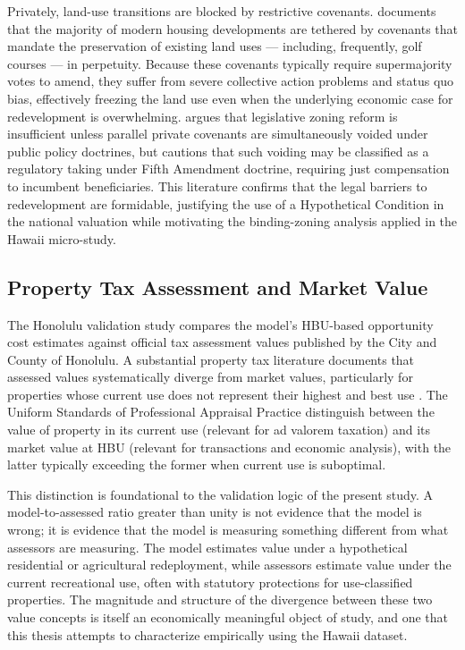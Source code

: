 \documentclass[11pt, letterpaper]{article}
\begin{document}
Privately, land-use transitions are blocked by restrictive covenants. \textcite{Ellickson2022} documents that the majority of modern housing developments are tethered by covenants that mandate the preservation of existing land uses --- including, frequently, golf courses --- in perpetuity. Because these covenants typically require supermajority votes to amend, they suffer from severe collective action problems and status quo bias, effectively freezing the land use even when the underlying economic case for redevelopment is overwhelming. \textcite{Korngold2024} argues that legislative zoning reform is insufficient unless parallel private covenants are simultaneously voided under public policy doctrines, but cautions that such voiding may be classified as a regulatory taking under Fifth Amendment doctrine, requiring just compensation to incumbent beneficiaries. This literature confirms that the legal barriers to redevelopment are formidable, justifying the use of a Hypothetical Condition in the national valuation while motivating the binding-zoning analysis applied in the Hawaii micro-study.

\subsection{Property Tax Assessment and Market Value}

The Honolulu validation study compares the model's HBU-based opportunity cost estimates against official tax assessment values published by the City and County of Honolulu. A substantial property tax literature documents that assessed values systematically diverge from market values, particularly for properties whose current use does not represent their highest and best use \parencite{AppraisalInstitute2020}. The Uniform Standards of Professional Appraisal Practice distinguish between the value of property in its current use (relevant for ad valorem taxation) and its market value at HBU (relevant for transactions and economic analysis), with the latter typically exceeding the former when current use is suboptimal.

This distinction is foundational to the validation logic of the present study. A model-to-assessed ratio greater than unity is not evidence that the model is wrong; it is evidence that the model is measuring something different from what assessors are measuring. The model estimates value under a hypothetical residential or agricultural redeployment, while assessors estimate value under the current recreational use, often with statutory protections for use-classified properties. The magnitude and structure of the divergence between these two value concepts is itself an economically meaningful object of study, and one that this thesis attempts to characterize empirically using the Hawaii dataset.
\end{document}
